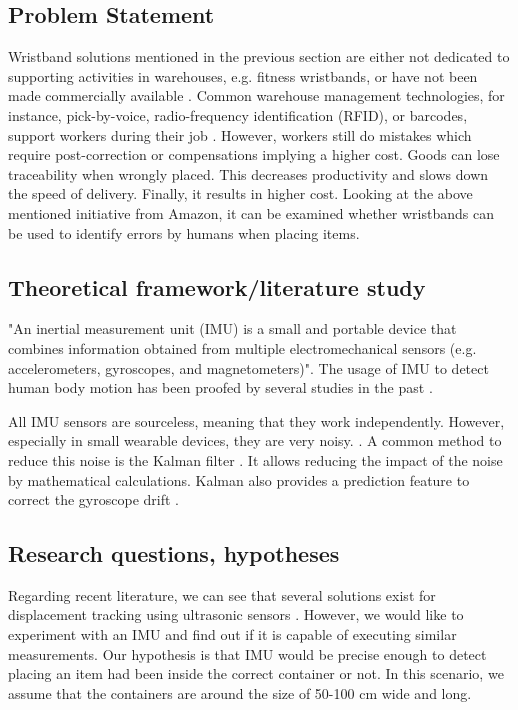 \documentclass[12pt,twoside, hidelinks]{article}
\begin{document}
\subsection{Problem Statement}
\label{sect:problem}
Wristband solutions mentioned in the previous section are either not dedicated to supporting activities in warehouses, e.g. fitness wristbands, or have not been made commercially available \cite{bergerLudwig2007}. Common warehouse management technologies, for instance, pick-by-voice, radio-frequency identification (RFID), or barcodes, support workers during their job \cite{battini2015}. However, workers still do mistakes which require post-correction or compensations implying a higher cost. Goods can lose traceability when wrongly placed. This decreases productivity and slows down the speed of delivery. Finally, it results in higher cost. Looking at the above mentioned initiative from Amazon, it can be examined whether wristbands can be used to identify errors by humans when placing items.

\subsection{Theoretical framework/literature study}
\label{sect:framework}

"An inertial measurement unit (IMU) is a small and portable device that combines information obtained from multiple electromechanical sensors (e.g. accelerometers, gyroscopes, and magnetometers)"\cite{schall2016}. The usage of IMU to detect human body motion has been proofed by several studies in the past \cite{schall2016} \cite{tao2018} \cite{georgi2015}.

All IMU sensors are sourceless, meaning that they work independently. However, especially in small wearable devices, they are very noisy. \cite{gallagher2004efficient}. A common method to reduce this noise is the Kalman  filter \cite{kalman1960new}. It allows reducing the impact of the noise by mathematical calculations. Kalman also provides a prediction feature to correct the gyroscope drift \cite{Welch95anintroduction} \cite{Lee2009}.


\subsection{Research questions, hypotheses}
\label{sect:questions}

Regarding recent literature, we can see that several solutions exist for displacement tracking using ultrasonic sensors \cite{QiYongbin2014Awwu}. However, we would like to experiment with an IMU and find out if it is capable of executing similar measurements. 
Our hypothesis is that IMU would be precise enough to detect placing an item had been inside the correct container or not. In this scenario, we assume that the containers are around the size of 50-100 cm wide and long.
\end{document}

